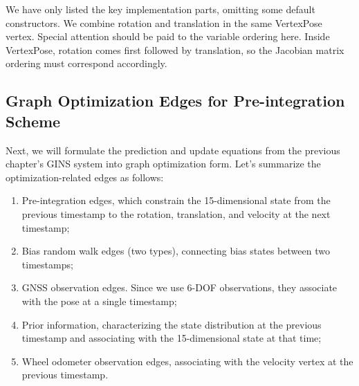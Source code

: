 We have only listed the key implementation parts, omitting some default constructors. We combine rotation and translation in the same VertexPose vertex. Special attention should be paid to the variable ordering here. Inside VertexPose, rotation comes first followed by translation, so the Jacobian matrix ordering must correspond accordingly.

\subsection{Graph Optimization Edges for Pre-integration Scheme}

Next, we will formulate the prediction and update equations from the previous chapter's GINS system into graph optimization form. Let's summarize the optimization-related edges as follows:
\begin{enumerate}
	\item Pre-integration edges, which constrain the 15-dimensional state from the previous timestamp to the rotation, translation, and velocity at the next timestamp;
	\item Bias random walk edges (two types), connecting bias states between two timestamps;
	\item GNSS observation edges. Since we use 6-DOF observations, they associate with the pose at a single timestamp;
	\item Prior information, characterizing the state distribution at the previous timestamp and associating with the 15-dimensional state at that time;
	\item Wheel odometer observation edges, associating with the velocity vertex at the previous timestamp.
\end{enumerate}

